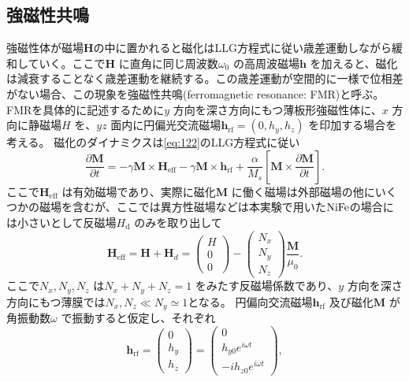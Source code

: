 \documentclass[dvipdfmx]{jsreport}
\numberwithin{equation}{chapter}
\numberwithin{table}{chapter}
\begin{document}
\subsection{強磁性共鳴}
強磁性体が磁場$\bm{H}$の中に置かれると磁化はLLG方程式に従い歳差運動しながら緩和していく。ここで$\bm{H}$ に直角に同じ周波数$\omega_0$ の高周波磁場$\bm{h}$ を加えると、磁化は減衰することなく歳差運動を継続する。この歳差運動が空間的に一様で位相差がない場合、この現象を強磁性共鳴(ferromagnetic resonance: FMR)と呼ぶ。FMRを具体的に記述するために$y$ 方向を深さ方向にもつ薄板形強磁性体に、$x$ 方向に静磁場$H$ を、$yz$ 面内に円偏光交流磁場$\bm{h}_\text{rf} =(0,h_y,h_z)$ を印加する場合を考える。
磁化のダイナミクスは\eqref{eq:122}のLLG方程式に従い
\begin{equation}
\label{eq:130}
	\frac{\partial \bm{M}}{\partial t} =-\gamma\bm{M}\times \bm{H}_\text{eff}-\gamma \bm{M}\times \bm{h}_\text{rf} +\frac{\alpha}{M_s}\left[ \bm{M}\times \frac{\partial \bm{M}}{\partial t}  \right] 
.\end{equation}
ここで$\bm{H}_\text{eff} $ は有効磁場であり、実際に磁化$\bm{M}$ に働く磁場は外部磁場の他にいくつかの磁場を含むが、ここでは異方性磁場などは本実験で用いた$\ce{NiFe}$の場合には小さいとして反磁場$H_\text{d} $ のみを取り出して
\begin{equation}
\label{eq:131}
	\bm{H}_\text{eff} =\bm{H}+\bm{H}_d=\begin{pmatrix} H\\0\\0 \end{pmatrix} -\begin{pmatrix} N_x\\N_y\\N_z \end{pmatrix} \frac{\bm{M}}{\mu_0}
.\end{equation}
ここで$N_x,N_y,N_z$ は$N_x+N_y+N_z=1$ をみたす反磁場係数であり、$y$ 方向を深さ方向にもつ薄膜では$N_x,N_z\ll N_y\simeq 1$となる。
円偏向交流磁場$\bm{h}_\text{rf} $ 及び磁化$\bm{M}$ が角振動数$\omega$ で振動すると仮定し、それぞれ
\begin{equation}
\label{eq:132}
	\bm{h}_\text{rf} =\begin{pmatrix} 0\\h_y\\h_z \end{pmatrix} = \begin{pmatrix} 0\\h_{y0}e^{i\omega t}\\-ih_{z 0}e^{i\omega t} \end{pmatrix} 
,\end{equation}
\end{document}
